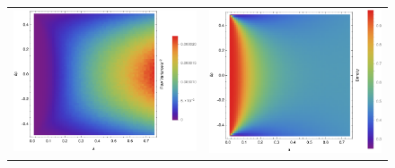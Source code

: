 \begin{figure}[h!]
\begin{center}
\begin{tabular}{c|c}
    \hline
    \includegraphics[width=0.5\linewidth]{../tex-src/images/constDens/varFlow-crop} & \includegraphics[width=0.5\linewidth]{../tex-src/images/constDens/meanDens-crop} \\
    \end{tabular}
\end{center}
    \vspace{-0em}
\end{figure}




